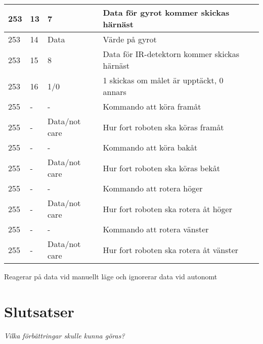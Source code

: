 \documentclass[11pt]{article}
\begin{document}
\begin{flushleft}
\begin{table}[h]
\begin{tabular}{|l|l|l|l|l|}
253 & 13 & 7 & Data för gyrot kommer skickas härnäst \\ \hline
253 & 14 & Data & Värde på gyrot \\ \hline

253 & 15 & 8 & Data för IR-detektorn kommer skickas härnäst \\ \hline
253 & 16 & 1/0 & 1 skickas om målet är upptäckt, 0 annars \\ \hline

255 & - & - & Kommando att köra framåt \\ \hline
255 & - & Data/not care\text{*} & Hur fort roboten ska köras framåt \\ \hline
255 & - & - & Kommando att köra bakåt \\ \hline
255 & - & Data/not care & Hur fort roboten ska köras bekåt \\ \hline
255 & - & - & Kommando att rotera höger \\ \hline
255 & - & Data/not care & Hur fort roboten ska rotera åt höger  \\ \hline
255 & - & - & Kommando att rotera vänster \\ \hline
255 & - & Data/not care & Hur fort roboten ska rotera åt vänster  \\ \hline

\end{tabular}
\end{table}

\text{*} Reagerar på data vid manuellt läge och ignorerar data vid autonomt

\section{Slutsatser}
\textit{Vilka förbättringar skulle kunna göras?}

\pagebreak
{}



\pagebreak


\appendix

\end{flushleft}
\end{document}
